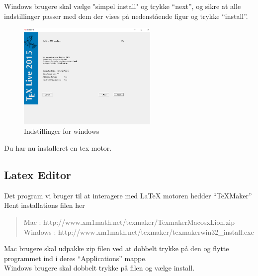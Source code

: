 \documentclass{article}                                                        %
\begin{document}
\begin{itemize}
        
        Windows brugere skal vælge "simpel install" og trykke ``next'', og
        sikre at alle indstillinger passer med dem der vises på nedenstående
        figur og trykke ``install''.
        \begin{figure}[h!]
            \caption{Indstillinger for windows}
            \centering
            \includegraphics[width=0.6\textwidth]{./winSet.png}
        \end{figure}
        Du har nu installeret en tex motor.
		 \end{itemize}
		 
        \subsection{Latex Editor}
        Det program vi bruger til at interagere med LaTeX motoren hedder
        ``TeXMaker'' Hent installations filen her
            \begin{quote}
            Mac : http://www.xm1math.net/texmaker/TexmakerMacosxLion.zip  \\
            Windows : http://www.xm1math.net/texmaker/texmakerwin32\_install.exe
            \end{quote}

        Mac brugere skal udpakke zip filen ved at dobbelt trykke på den og
        flytte programmet ind i deres ``Applications'' mappe. \\
        Windows brugere skal dobbelt trykke på filen og vælge install. 
   		\begin{figure}%
    		\centering
	    	\qquad
		\end{figure}
	
\end{document}
